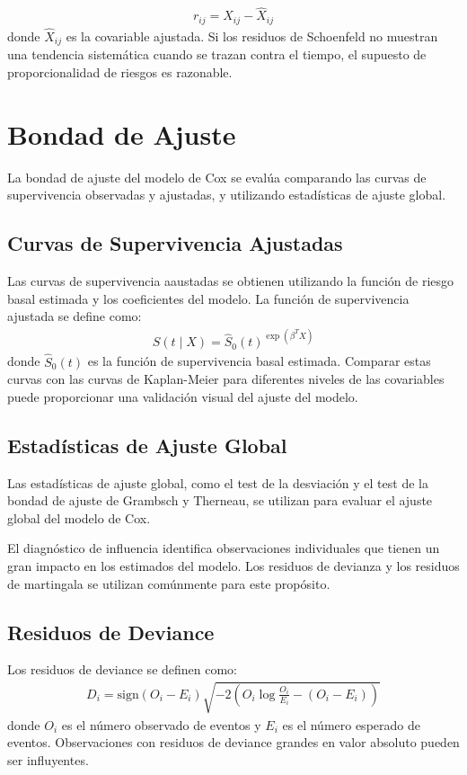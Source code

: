 \documentclass[a4paper]{report} %
\begin{document}
\begin{eqnarray}
r_{ij} = X_{ij} - \hat{X}_{ij}
\end{eqnarray}
donde $\hat{X}_{ij}$ es la covariable ajustada. Si los residuos de Schoenfeld no muestran una tendencia sistem\'atica cuando se trazan contra el tiempo, el supuesto de proporcionalidad de riesgos es razonable.

\section*{Bondad de Ajuste}
La bondad de ajuste del modelo de Cox se eval\'ua comparando las curvas de supervivencia observadas y ajustadas, y utilizando estad\'isticas de ajuste global.

\subsection*{Curvas de Supervivencia Ajustadas}
Las curvas de supervivencia aaustadas se obtienen utilizando la funci\'on de riesgo basal estimada y los coeficientes del modelo. La funci\'on de supervivencia ajustada se define como:
\begin{eqnarray*}
\hat{S}(t \mid X) = \hat{S}_0(t)^{\exp(\beta^T X)}
\end{eqnarray*}
donde $\hat{S}_0(t)$ es la funci\'on de supervivencia basal estimada. Comparar estas curvas con las curvas de Kaplan-Meier para diferentes niveles de las covariables puede proporcionar una validaci\'on visual del ajuste del modelo.

\subsection*{Estad\'isticas de Ajuste Global}
Las estad\'isticas de ajuste global, como el test de la desviaci\'on y el test de la bondad de ajuste de Grambsch y Therneau, se utilizan para evaluar el ajuste global del modelo de Cox.

El diagn\'ostico de influencia identifica observaciones individuales que tienen un gran impacto en los estimados del modelo. Los residuos de devianza y los residuos de martingala se utilizan com\'unmente para este prop\'osito.

\subsection*{Residuos de Deviance}
Los residuos de deviance se definen como:
\begin{eqnarray*}
D_i = \text{sign}(O_i - E_i) \sqrt{-2 \left(O_i \log \frac{O_i}{E_i} - (O_i - E_i)\right)}
\end{eqnarray*}
donde $O_i$ es el n\'umero observado de eventos y $E_i$ es el n\'umero esperado de eventos. Observaciones con residuos de deviance grandes en valor absoluto pueden ser influyentes.
\end{document}
